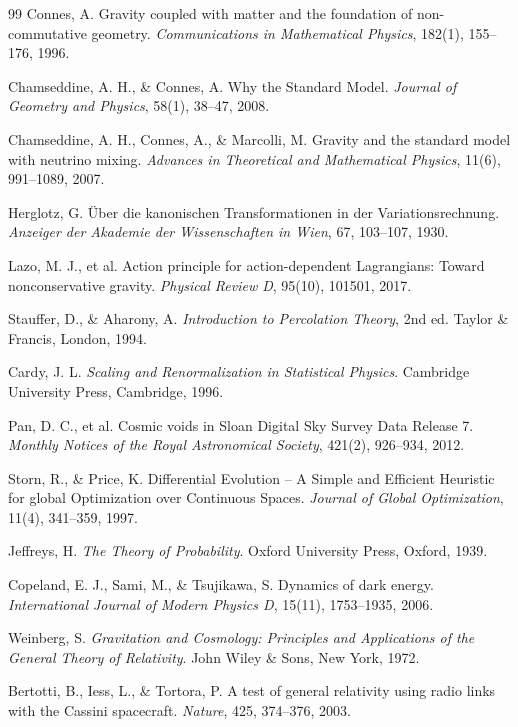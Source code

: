 \documentclass[12pt, a4paper]{article}
\theoremstyle{plain}
\theoremstyle{definition}
\begin{document}
\begin{thebibliography}{99}
Connes, A.
\newblock Gravity coupled with matter and the foundation of non-commutative geometry.
\newblock \textit{Communications in Mathematical Physics}, 182(1), 155–176, 1996.

Chamseddine, A. H., \& Connes, A.
\newblock Why the Standard Model.
\newblock \textit{Journal of Geometry and Physics}, 58(1), 38–47, 2008.

Chamseddine, A. H., Connes, A., \& Marcolli, M.
\newblock Gravity and the standard model with neutrino mixing.
\newblock \textit{Advances in Theoretical and Mathematical Physics}, 11(6), 991–1089, 2007.

Herglotz, G.
\newblock Über die kanonischen Transformationen in der Variationsrechnung.
\newblock \textit{Anzeiger der Akademie der Wissenschaften in Wien}, 67, 103–107, 1930.

Lazo, M. J., et al.
\newblock Action principle for action-dependent Lagrangians: Toward nonconservative gravity.
\newblock \textit{Physical Review D}, 95(10), 101501, 2017.

Stauffer, D., \& Aharony, A.
\newblock \textit{Introduction to Percolation Theory}, 2nd ed.
\newblock Taylor \& Francis, London, 1994.

Cardy, J. L.
\newblock \textit{Scaling and Renormalization in Statistical Physics}.
\newblock Cambridge University Press, Cambridge, 1996.

Pan, D. C., et al.
\newblock Cosmic voids in Sloan Digital Sky Survey Data Release 7.
\newblock \textit{Monthly Notices of the Royal Astronomical Society}, 421(2), 926–934, 2012.

Storn, R., \& Price, K.
\newblock Differential Evolution – A Simple and Efficient Heuristic for global Optimization over Continuous Spaces.
\newblock \textit{Journal of Global Optimization}, 11(4), 341–359, 1997.

Jeffreys, H.
\newblock \textit{The Theory of Probability}.
\newblock Oxford University Press, Oxford, 1939.

Copeland, E. J., Sami, M., \& Tsujikawa, S.
\newblock Dynamics of dark energy.
\newblock \textit{International Journal of Modern Physics D}, 15(11), 1753–1935, 2006.

Weinberg, S.
\newblock \textit{Gravitation and Cosmology: Principles and Applications of the General Theory of Relativity}.
\newblock John Wiley \& Sons, New York, 1972.

Bertotti, B., Iess, L., \& Tortora, P.
\newblock A test of general relativity using radio links with the Cassini spacecraft.
\newblock \textit{Nature}, 425, 374–376, 2003.

\end{thebibliography}
\end{document}

